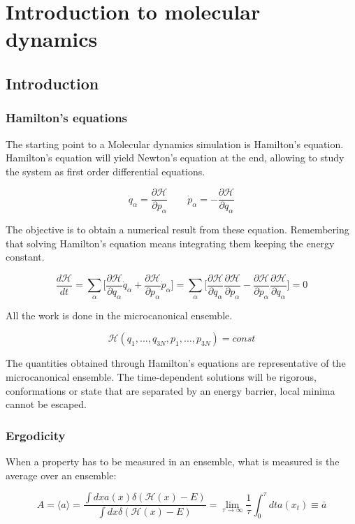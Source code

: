 \chapter{Introduction to molecular dynamics}

\section{Introduction}

	\subsection{Hamilton's equations}
	The starting point to a Molecular dynamics simulation is Hamilton's equation.
	Hamilton's equation will yield Newton's equation at the end, allowing to study the system as first order differential equations.

	$$\dot{q}_\alpha = \frac{\partial\mathcal{H}}{\partial p_\alpha}\qquad\dot{p}_\alpha = - \frac{\partial\mathcal{H}}{\partial q_\alpha}$$

	The objective is to obtain a numerical result from these equation.
	Remembering that solving Hamilton's equation means integrating them keeping the energy constant.

	$$\frac{d\mathcal{H}}{dt} = \sum\limits_\alpha\biggl[\frac{\partial\mathcal{H}}{\partial q_\alpha}\dot{q}_\alpha + \frac{\partial\mathcal{H}}{\partial p_\alpha}\dot{p}_\alpha\biggr] = \sum\limits_\alpha\biggl[\frac{\partial\mathcal{H}}{\partial q_\alpha}\frac{\partial\mathcal{H}}{\partial p_\alpha}-\frac{\partial\mathcal{H}}{\partial p_\alpha}\frac{\partial\mathcal{H}}{\partial q_\alpha}\biggr] = 0$$

	All the work is done in the microcanonical ensemble.

	$$\mathcal{H}(q_1, \dots, q_{3N}, p_1, \dots, p_{3N}) = const$$

	The quantities obtained through Hamilton's equations are representative of the microcanonical ensemble.
	The time-dependent solutions will be rigorous, conformations or state that are separated by an energy barrier, local minima cannot be escaped.

	\subsection{Ergodicity}
	When a property has to be measured in an ensemble, what is measured is the average over an ensemble:

	$$A = \langle a\rangle = \frac{\int dxa(x)\delta(\mathcal{H}(x)-E)}{\int dx\delta(\mathcal{H}(x)-E)} = \lim\limits_{\tau\rightarrow\infty}\frac{1}{\tau}\int_0^\tau dta(x_t)\equiv\bar{a}$$

